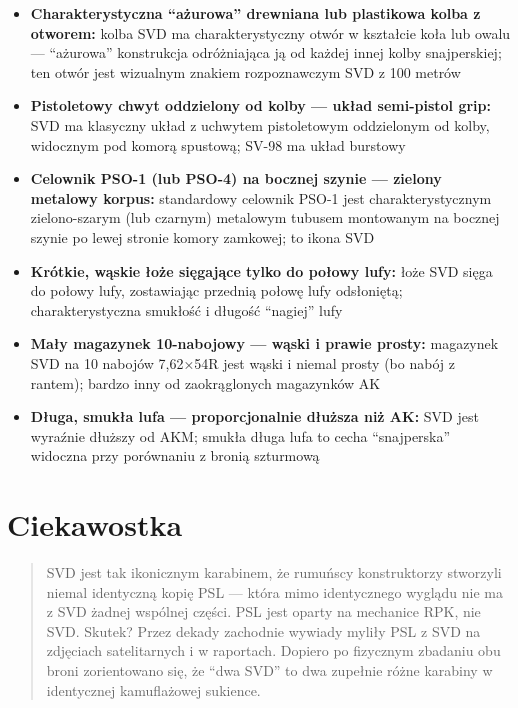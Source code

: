 \documentclass[12pt,openany,oneside]{book}
\providecommand{\tightlist}{%
  \setlength{\itemsep}{0pt}\setlength{\parskip}{0pt}}
\begin{document}
\begin{itemize}
\tightlist
\item
  \textbf{Charakterystyczna ``ażurowa'' drewniana lub plastikowa kolba z
  otworem:} kolba SVD ma charakterystyczny otwór w kształcie koła lub
  owalu --- ``ażurowa'' konstrukcja odróżniająca ją od każdej innej
  kolby snajperskiej; ten otwór jest wizualnym znakiem rozpoznawczym SVD
  z 100 metrów
\item
  \textbf{Pistoletowy chwyt oddzielony od kolby --- układ semi-pistol
  grip:} SVD ma klasyczny układ z uchwytem pistoletowym oddzielonym od
  kolby, widocznym pod komorą spustową; SV-98 ma układ burstowy
\item
  \textbf{Celownik PSO-1 (lub PSO-4) na bocznej szynie --- zielony
  metalowy korpus:} standardowy celownik PSO-1 jest charakterystycznym
  zielono-szarym (lub czarnym) metalowym tubusem montowanym na bocznej
  szynie po lewej stronie komory zamkowej; to ikona SVD
\item
  \textbf{Krótkie, wąskie łoże sięgające tylko do połowy lufy:} łoże SVD
  sięga do połowy lufy, zostawiając przednią połowę lufy odsłoniętą;
  charakterystyczna smukłość i długość ``nagiej'' lufy
\item
  \textbf{Mały magazynek 10-nabojowy --- wąski i prawie prosty:}
  magazynek SVD na 10 nabojów 7,62×54R jest wąski i niemal prosty (bo
  nabój z rantem); bardzo inny od zaokrąglonych magazynków AK
\item
  \textbf{Długa, smukła lufa --- proporcjonalnie dłuższa niż AK:} SVD
  jest wyraźnie dłuższy od AKM; smukła długa lufa to cecha
  ``snajperska'' widoczna przy porównaniu z bronią szturmową
\end{itemize}

\section{Ciekawostka}\label{ciekawostka-62}

\begin{quote}
SVD jest tak ikonicznym karabinem, że rumuńscy konstruktorzy stworzyli
niemal identyczną kopię PSL --- która mimo identycznego wyglądu nie ma z
SVD żadnej wspólnej części. PSL jest oparty na mechanice RPK, nie SVD.
Skutek? Przez dekady zachodnie wywiady myliły PSL z SVD na zdjęciach
satelitarnych i w raportach. Dopiero po fizycznym zbadaniu obu broni
zorientowano się, że ``dwa SVD'' to dwa zupełnie różne karabiny w
identycznej kamuflażowej sukience.
\end{quote}
\end{document}
